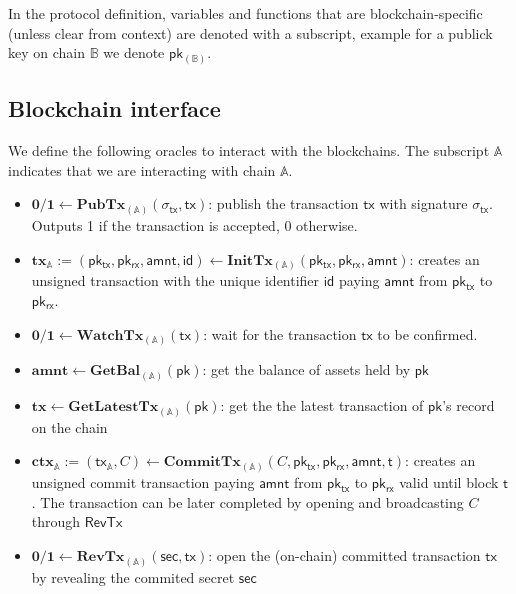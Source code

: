 \documentclass{article}      	%
\begin{document}
In the protocol definition, variables and functions that are blockchain-specific (unless clear from context) are denoted with a subscript, example for a publick key on chain $\mathbb{B}$ we denote $\mathsf{pk_{(\mathbb{B})}}$. \\


\subsection{Blockchain interface}

We define the following oracles to interact with the blockchains. The subscript $\mathbb{A}$ indicates that we are interacting with chain $\mathbb{A}$.

\begin{itemize}[topsep=0pt, itemsep=0pt, leftmargin=2em]
    \item $\mathbf{0/1} \leftarrow \mathsf{\textbf{PubTx}}_{(\mathbb{A})}(\sigma_{\mathsf{tx}}, \mathsf{tx})$: publish the transaction $\mathsf{tx}$ with signature $\sigma_{\mathsf{tx}}$. Outputs 1 if the transaction is accepted, 0 otherwise.
    \item $\mathbf{tx}_{\mathbb{A}} := (\mathsf{pk_{tx}}, \mathsf{pk_{rx}}, \mathsf{amnt}, \mathsf{id})  \leftarrow \mathbf{InitTx}_{(\mathbb{A})}(\mathsf{pk_{tx}}, \mathsf{pk_{rx}}, \mathsf{amnt})$: creates an unsigned transaction with the unique identifier $\mathsf{id}$ paying $\mathsf{amnt}$ from $\mathsf{pk_{tx}}$ to $\mathsf{pk_{rx}}$.
    \item $\mathbf{0/1} \leftarrow \mathbf{WatchTx}_{(\mathbb{A})}(\mathsf{tx})$: wait for the transaction $\mathsf{tx}$ to be confirmed.
    \item $\mathbf{amnt} \leftarrow \mathbf{GetBal}_{(\mathbb{A})}(\mathsf{pk})$: get the balance of assets held by $\mathsf{pk}$
    \item $\mathbf{tx} \leftarrow \mathbf{GetLatestTx}_{(\mathbb{A})}(\mathsf{pk})$: get the the latest transaction of $\mathsf{pk}$'s record on the chain
    \item $\mathbf{ctx}_{\mathbb{A}} := (\mathsf{tx_{\mathbb{A}}}, C) \leftarrow \mathbf{CommitTx}_{(\mathbb{A})}(C, \mathsf{pk_{tx}}, \mathsf{pk_{rx}}, \mathsf{amnt}, \mathsf{t})$: creates an unsigned commit transaction paying $\mathsf{amnt}$ from $\mathsf{pk_{tx}}$ to $\mathsf{pk_{rx}}$ valid until block $\mathsf{t}$. The transaction can be later completed by opening and broadcasting $C$ through $\mathsf{RevTx}$
    \item $ \mathbf{0/1} \leftarrow \mathbf{RevTx}_{(\mathbb{A})}(\mathsf{sec}, \mathsf{tx})$: open the (on-chain) committed transaction $\mathsf{tx}$ by revealing the commited secret $\mathsf{sec}$
\end{itemize}
\end{document}

